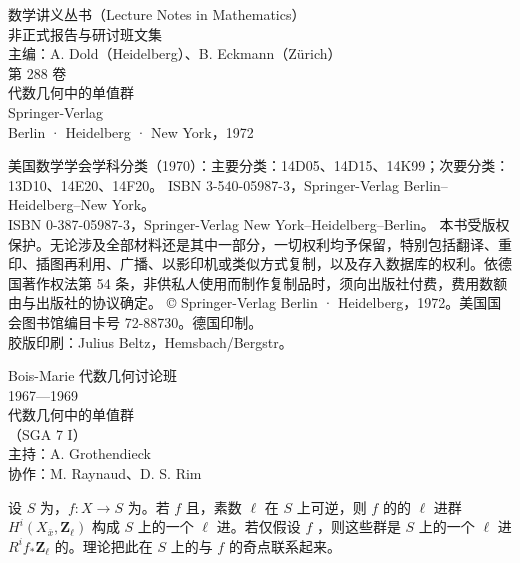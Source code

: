 \begin{center}
{\large 数学讲义丛书（Lecture Notes in Mathematics）}\\
非正式报告与研讨班文集\\
主编：A. Dold（Heidelberg）、B. Eckmann（Zürich）\\[1ex]
第 288 卷\\[1ex]
{\Large 代数几何中的单值群}\\[1ex]
Springer-Verlag\\
Berlin · Heidelberg · New York，1972
\end{center}
\noindent 美国数学学会学科分类（1970）：主要分类：14D05、14D15、14K99；次要分类：13D10、14E20、14F20。
\noindent ISBN 3-540-05987-3，Springer-Verlag Berlin–Heidelberg–New York。\\
ISBN 0-387-05987-3，Springer-Verlag New York–Heidelberg–Berlin。
本书受版权保护。无论涉及全部材料还是其中一部分，一切权利均予保留，特别包括翻译、重印、插图再利用、广播、以影印机或类似方式复制，以及存入数据库的权利。依德国著作权法第 54 条，非供私人使用而制作复制品时，须向出版社付费，费用数额由与出版社的协议确定。
\noindent © Springer-Verlag Berlin · Heidelberg，1972。美国国会图书馆编目卡号 72-88730。德国印制。\\
胶版印刷：Julius Beltz，Hemsbach/Bergstr。
\begin{center}
{\large Bois-Marie 代数几何讨论班}\\
1967—1969\\[1ex]
{\Large 代数几何中的单值群}\\
（SGA 7 I）\\[1ex]
主持：A. Grothendieck\\
协作：M. Raynaud、D. S. Rim
\end{center}
设 $S$ 为，$f:X\to S$ 为。若 $f$ 且，素数 $\ell$ 在 $S$ 上可逆，则 $f$ 的的 $\ell$ 进群 $H^i(X_{\bar x},\mathbf Z_\ell)$ 构成 $S$ 上的一个 $\ell$ 进。若仅假设 $f$ ，则这些群是 $S$ 上的一个 $\ell$ 进 $R^if_*\mathbf Z_\ell$ 的。理论把此在 $S$ 上的与 $f$ 的奇点联系起来。

